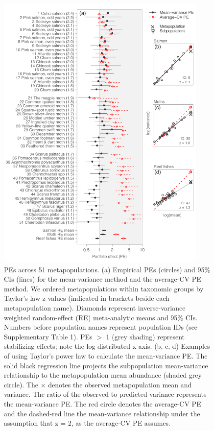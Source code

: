\clearpage
\begin{figure}[htbp]
  \centering \includegraphics[height=5.5in]{prophets/fig3}
  \caption{
  PEs across 51 metapopulations. (a) Empirical PEs (circles) and 95\%
    CIs (lines) for the mean-variance method and the average-CV PE method.
    We ordered metapopulations within taxonomic groups by Taylor's law z values
    (indicated in brackets beside each metapopulation name). Diamonds represent
    inverse-variance weighted random-effect (RE) meta-analytic means and 95\%
    CIs. Numbers before population names represent population IDs (see
    Supplementary Table 1). PEs $>$ 1 (grey shading) represent stabilizing
    effects; note the log-distributed x-axis. (b, c, d) Examples of using
    Taylor's power law to calculate the mean-variance PE. The solid black
    regression line projects the subpopulation mean-variance relationship to the
    metapopulation mean abundance (shaded grey circle). The $\times$ denotes the
    observed metapopulation mean and variance. The ratio of the observed to
    predicted variance represents the mean-variance PE. The red circle denotes
    the average-CV PE and the dashed-red line the mean-variance relationship
    under the assumption that z = 2, as the average-CV PE assumes.
  }
  \label{fig:meta}
\end{figure}
